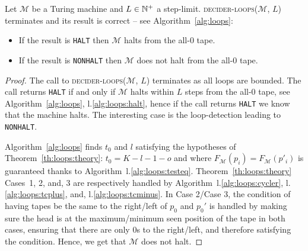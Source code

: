 \begin{theorem}\label{th:loops}
    Let $\mathcal{M}$ be a Turing machine and $L \in \mathbb{N}^+$ a step-limit. \textsc{decider-loops}($\mathcal{M}$, $L$) terminates and its result is correct -- see Algorithm~\ref{alg:loops}:
    \begin{itemize}
        \item If the result is \texttt{HALT} then $\mathcal{M}$ halts from the all-0 tape.
        \item If the result is \texttt{NONHALT} then $\mathcal{M}$ does not halt from the all-0 tape.
    \end{itemize}
\end{theorem}
\begin{proof}
    The call to \textsc{decider-loops}($\mathcal{M}$, $L$) terminates as all loops are bounded. The call returns \texttt{HALT} if and only if $\mathcal{M}$ halts within $L$ steps from the all-0 tape, see Algorithm~\ref{alg:loops}, l.\ref{alg:loops:halt}, hence if the call returns \texttt{HALT} we know that the machine halts. The interesting case is the loop-detection leading to \texttt{NONHALT}.

    Algorithm~\ref{alg:loops} finds $t_0$ and $l$ satisfying the hypotheses of Theorem~\ref{th:loops:theory}: $t_0 = K-l-1-o$
    and where $F_\mathcal{M}(p_i)   = F_\mathcal{M}(p'_i)$ is guaranteed thanks to Algorithm~l.\ref{alg:loops:testeq}. Theorem~\ref{th:loops:theory} Cases~1, 2, and, 3 are respectively handled by Algorithm~l.\ref{alg:loops:cycler}, l.\ref{alg:loops:tcplus}, and, l.\ref{alg:loops:tcminus}. In Case 2/Case 3, the condition of having tapes be the same to the right/left of $p_0$ and $p_0'$ is handled by making sure the head is at the maximum/minimum seen position of the tape in both cases, ensuring that there are only 0s to the right/left, and therefore satisfying the condition. Hence, we get that $\mathcal{M}$ does not halt.
\end{proof}




